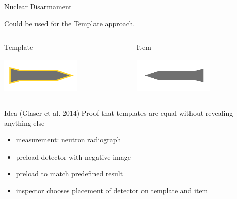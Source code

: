 \documentclass[presentation]{beamer}
\begin{document}
\begin{frame}[label=sec-5-4]{Nuclear Disarmament}
\begin{center}
Could be used for the Template approach.
\end{center}

\vspace{-0.7cm}

\begin{columns}
\begin{column}{0.48\textwidth}

\begin{center}
    Template

    \includegraphics[width=0.6\textwidth]{images/zkp/template.pdf}
\end{center}
\end{column}

\begin{column}{0.48\textwidth}

\begin{center}
    Item

    \includegraphics[width=0.6\textwidth]{images/zkp/item.pdf}
\end{center}
\end{column}
\end{columns}

\begin{block}{Idea (Glaser et al. 2014)}
Proof that templates are equal without revealing anything else\\[0.5em]

\begin{itemize}
\item measurement: neutron radiograph
\item preload detector with negative image
\item preload to match predefined result
\item inspector chooses placement of detector on template and item
\end{itemize}
\end{block}
\end{frame}
\end{document}
